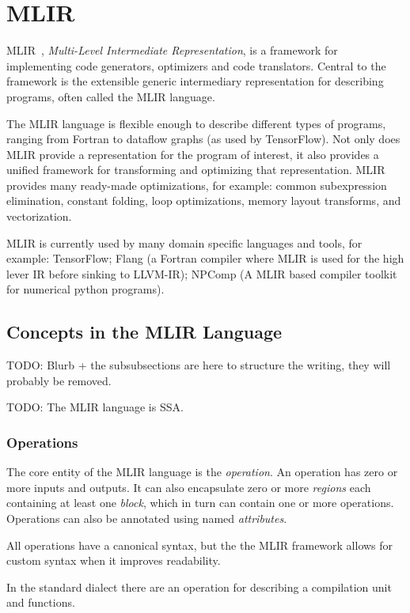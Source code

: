 \section{MLIR}

MLIR~\cite{MLIR}, \textit{Multi-Level Intermediate Representation}, is
a framework for implementing code generators, optimizers and code
translators. Central to the framework is the extensible generic
intermediary representation for describing programs, often called the
MLIR language.

The MLIR language is flexible enough to describe different types of
programs, ranging from Fortran to dataflow graphs (as used by
TensorFlow). Not only does MLIR provide a representation for the
program of interest, it also provides a unified framework for
transforming and optimizing that representation. MLIR provides many
ready-made optimizations, for example: common subexpression
elimination, constant folding, loop optimizations, memory layout
transforms, and vectorization.

MLIR is currently used by many domain specific languages and tools,
for example: TensorFlow; Flang (a Fortran compiler where MLIR is used
for the high lever IR before sinking to LLVM-IR); NPComp (A MLIR based
compiler toolkit for numerical python programs).

\subsection{Concepts in the MLIR Language}

TODO: Blurb + the subsubsections are here to structure the writing,
they will probably be removed.

TODO: The MLIR language is SSA.

\subsubsection{Operations}

The core entity of the MLIR language is the \textit{operation}. An
operation has zero or more inputs and outputs. It can also encapsulate
zero or more \textit{regions} each containing at least one
\textit{block}, which in turn can contain one or more
operations. Operations can also be annotated using named
\textit{attributes}.

All operations have a canonical syntax, but the the MLIR framework
allows for custom syntax when it improves readability.

In the standard dialect there are an operation for describing a
compilation unit and functions.

